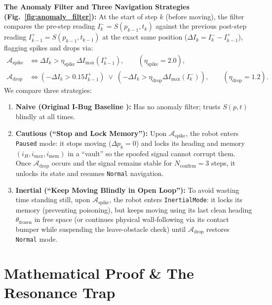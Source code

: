\documentclass[11pt, a4paper]{article}
\begin{document}
\noindent\textbf{The Anomaly Filter and Three Navigation Strategies (Fig.~\ref{fig:anomaly_filter}):}
At the start of step $k$ (before moving), the filter compares the pre-step reading $I_k^- = S(p_{k-1}, t_k)$ against the previous post-step reading $I_{k-1}^+ = S(p_{k-1}, t_{k-1})$ at the exact same position ($\Delta I_k = I_k^- - I_{k-1}^+$), flagging spikes and drops via:
\begin{align}
    \mathcal{A}_{\text{spike}} &\iff \Delta I_k > \eta_{\text{spike}}\,\Delta I_{\max}(I_{k-1}^+), \qquad (\eta_{\text{spike}} = 2.0), \label{eq:spike} \\
    \mathcal{A}_{\text{drop}} &\iff (-\Delta I_k > 0.15 I_{k-1}^+) \;\lor\; (-\Delta I_k > \eta_{\text{drop}}\Delta I_{\max}(I_k^-)), \qquad (\eta_{\text{drop}} = 1.2). \label{eq:drop}
\end{align}
We compare three strategies:
\begin{enumerate}
    \item \textbf{Naive (Original I-Bug Baseline \cite{taylor2014intensity}):} Has no anomaly filter; trusts $S(p, t)$ blindly at all times.
    \item \textbf{Cautious (``Stop and Lock Memory''):} Upon $\mathcal{A}_{\text{spike}}$, the robot enters \texttt{Paused} mode: it stops moving ($\Delta p_k = 0$) and locks its heading and memory $(i_H, i_{\text{max}}, i_{\text{mem}})$ in a ``vault'' so the spoofed signal cannot corrupt them. Once $\mathcal{A}_{\text{drop}}$ occurs and the signal remains stable for $N_{\text{confirm}} = 3$ steps, it unlocks its state and resumes \texttt{Normal} navigation.
    \item \textbf{Inertial (``Keep Moving Blindly in Open Loop''):} To avoid wasting time standing still, upon $\mathcal{A}_{\text{spike}}$, the robot enters \texttt{InertialMode}: it locks its memory (preventing poisoning), but keeps moving using its last clean heading $\theta_{\text{frozen}}$ in free space (or continues physical wall-following via its contact bumper while suspending the leave-obstacle check) until $\mathcal{A}_{\text{drop}}$ restores \texttt{Normal} mode.
\end{enumerate}

\section{Mathematical Proof \& The Resonance Trap}
\end{document}
